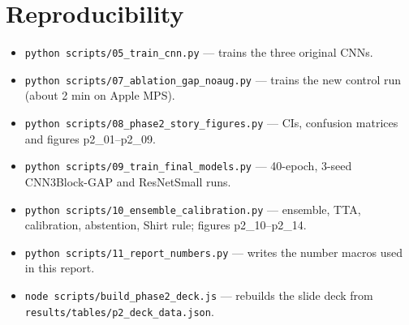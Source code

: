 \documentclass[11pt,a4paper]{article}
\begin{document}
\section{Reproducibility}
\begin{itemize}
\item \texttt{python scripts/05\_train\_cnn.py} --- trains the three original CNNs.
\item \texttt{python scripts/07\_ablation\_gap\_noaug.py} --- trains the new control run (about 2 min on Apple MPS).
\item \texttt{python scripts/08\_phase2\_story\_figures.py} --- CIs, confusion matrices and figures p2\_01--p2\_09.
\item \texttt{python scripts/09\_train\_final\_models.py} --- 40-epoch, 3-seed CNN3Block-GAP and ResNetSmall runs.
\item \texttt{python scripts/10\_ensemble\_calibration.py} --- ensemble, TTA, calibration, abstention, Shirt rule; figures p2\_10--p2\_14.
\item \texttt{python scripts/11\_report\_numbers.py} --- writes the number macros used in this report.
\item \texttt{node scripts/build\_phase2\_deck.js} --- rebuilds the slide deck from \texttt{results/tables/p2\_deck\_data.json}.
\end{itemize}
\end{document}
